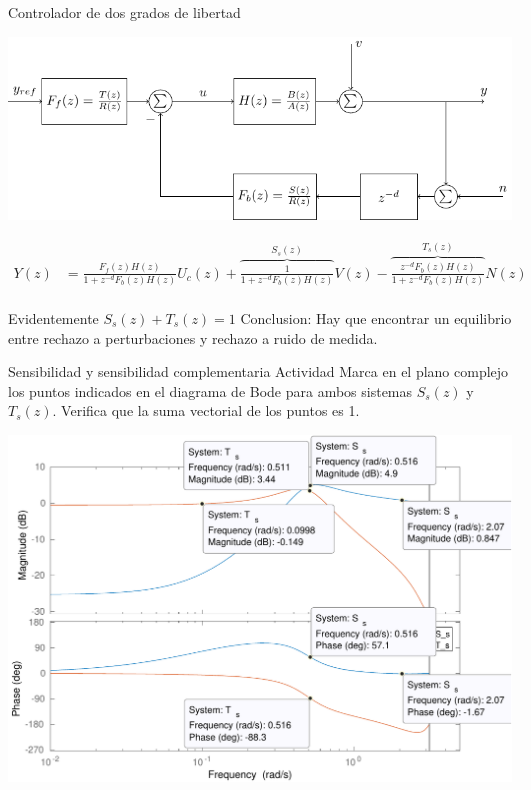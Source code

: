 \documentclass[presentation,aspectratio=169]{beamer}
\begin{document}
\begin{frame}[label={sec:orgedadaa8}]{Controlador de dos grados de libertad}
\begin{center}
\includegraphics[width=0.7\linewidth]{../../figures/2dof-block-explicit}
\end{center}

\begin{align*}
Y(z)     &= \frac{F_f(z)H(z)}{1 + z^{-d}F_b(z)H(z)}U_c(z) + \overbrace{\frac{1}{1 + z^{-d}F_b(z)H(z)}}^{S_s(z)}V(z)  - \overbrace{\frac{z^{-d}F_b(z)H(z)}{1 + z^{-d}F_b(z)H(z)}}^{T_s(z)}N(z)\\
\end{align*}

\alert{Evidentemente} \(S_s(z) + T_s(z) = 1\) \alert{Conclusion:} Hay que encontrar un equilibrio entre rechazo a perturbaciones y rechazo a ruido de medida.
\end{frame}

\begin{frame}[label={sec:orgc0acd4b}]{Sensibilidad y sensibilidad complementaria}
\alert{Actividad} Marca en el plano complejo los puntos indicados en el diagrama de Bode para ambos sistemas \(S_s(z)\) y \(T_s(z)\). Verifica que la suma vectorial de los puntos es 1.
\begin{center}
\includegraphics[width=0.7\linewidth]{../matlab/bode-sensitivity-exercise-crop}
\end{center}
\end{frame}
\end{document}
